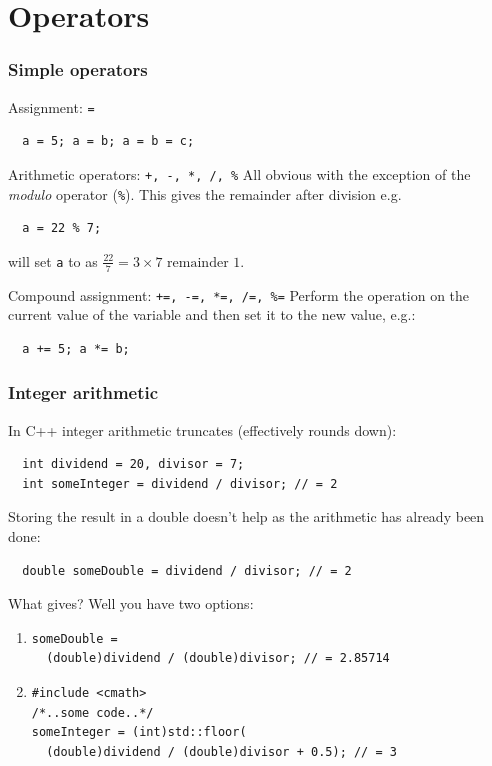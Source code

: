 \documentclass{beamer}
\begin{document}
\section{Operators}

\begin{frame}[fragile]
 \frametitle{Simple operators}
 \begin{block}{Assignment: \texttt{=}}
    \begin{lstlisting}
  a = 5; a = b; a = b = c; 
   \end{lstlisting}
  \end{block}
  \pause
  \begin{block}{Arithmetic operators: \texttt{+, -, *, /, \%}}
   All obvious with the exception of the \textit{modulo} operator (\texttt{\%}).  This gives the remainder after division e.g.
  \begin{lstlisting}
  a = 22 % 7;
  \end{lstlisting}
  will set \texttt{a} to  as $\frac{22}{7} = 3 \times 7 \text{ remainder } 1$.
 \end{block}
 \pause
 \begin{block}{Compound assignment: \texttt{+=, -=, *=, /=, \%=}}
  Perform the operation on the current value of the variable and then set it to the new value, e.g.:
  \begin{lstlisting}
  a += 5; a *= b;
  \end{lstlisting}
 \end{block} %
\end{frame}


\begin{frame}[fragile]
  \frametitle{Integer arithmetic}
  
  \begin{warnblocke}
  	In C++ integer arithmetic truncates (effectively rounds down):
  	\begin{lstlisting}
  int dividend = 20, divisor = 7;
  int someInteger = dividend / divisor; // = 2
  	\end{lstlisting}
  	Storing the result in a double doesn't help as the arithmetic has already been done:
  	\begin{lstlisting}
  double someDouble = dividend / divisor; // = 2
  	\end{lstlisting}
  	What gives?\pause{}  Well you have two options:
  	\begin{enumerate}
  	  \item{
  	  	\begin{lstlisting}
someDouble =
  (double)dividend / (double)divisor; // = 2.85714
  	  	\end{lstlisting}}
  	  \pause
  	  \item{
				\begin{lstlisting}
#include <cmath>
/*..some code..*/  
someInteger = (int)std::floor(
  (double)dividend / (double)divisor + 0.5); // = 3
				\end{lstlisting}
  	  }
  	\end{enumerate}
  \end{warnblocke}

\end{frame}
\end{document}
